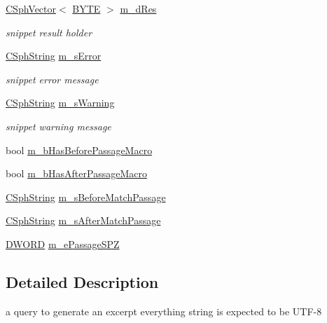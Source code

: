 \begin{DoxyCompactItemize}
\hyperlink{classCSphVector}{C\-Sph\-Vector}$<$ \hyperlink{sphinxstd_8h_a4ae1dab0fb4b072a66584546209e7d58}{B\-Y\-T\-E} $>$ \hyperlink{structExcerptQuery__t_aa06a838e2c4cf401af30bebb81dfde9c}{m\-\_\-d\-Res}
\begin{DoxyCompactList}\small\item\em snippet result holder \end{DoxyCompactList}\item 
\hyperlink{structCSphString}{C\-Sph\-String} \hyperlink{structExcerptQuery__t_a074979c7747d09bd010bd1b6e13593ad}{m\-\_\-s\-Error}
\begin{DoxyCompactList}\small\item\em snippet error message \end{DoxyCompactList}\item 
\hyperlink{structCSphString}{C\-Sph\-String} \hyperlink{structExcerptQuery__t_a32451a31255fd8c3f5633ff03e866c80}{m\-\_\-s\-Warning}
\begin{DoxyCompactList}\small\item\em snippet warning message \end{DoxyCompactList}\item 
bool \hyperlink{structExcerptQuery__t_a6a3efd8553f6be84a9b0e7ecc32872ad}{m\-\_\-b\-Has\-Before\-Passage\-Macro}
\item 
bool \hyperlink{structExcerptQuery__t_af620794af34fd344f58dd65a6410bcdd}{m\-\_\-b\-Has\-After\-Passage\-Macro}
\item 
\hyperlink{structCSphString}{C\-Sph\-String} \hyperlink{structExcerptQuery__t_a924103fb389bd8c162da903fce3f63f8}{m\-\_\-s\-Before\-Match\-Passage}
\item 
\hyperlink{structCSphString}{C\-Sph\-String} \hyperlink{structExcerptQuery__t_a93d98937c71d4d4672092dcc1d89532b}{m\-\_\-s\-After\-Match\-Passage}
\item 
\hyperlink{sphinxstd_8h_a798af1e30bc65f319c1a246cecf59e39}{D\-W\-O\-R\-D} \hyperlink{structExcerptQuery__t_adec0d35d6de552005d1ec2b771be2bb7}{m\-\_\-e\-Passage\-S\-P\-Z}
\end{DoxyCompactItemize}


\subsection{Detailed Description}
a query to generate an excerpt everything string is expected to be U\-T\-F-\/8 

